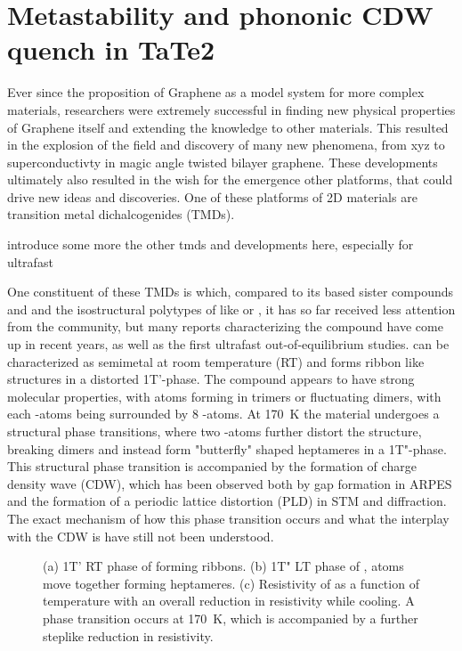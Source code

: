\chapter{Metastability and phononic CDW quench in TaTe2}

Ever since the proposition of Graphene as a model system for more complex materials, researchers were extremely successful in finding new physical properties of Graphene itself and extending the knowledge to other materials.
This resulted in the explosion of the field and discovery of many new phenomena, from xyz to superconductivty in magic angle twisted bilayer graphene.
These developments ultimately also resulted in the wish for the emergence other platforms, that could drive new ideas and discoveries.
One of these platforms of 2D materials are transition metal dichalcogenides (TMDs).

introduce some more the other tmds and developments here, especially for ultrafast

One constituent of these TMDs is  which, compared to its  based sister compounds  and  and the isostructural polytypes of  like  or , it has so far received less attention from the community, but many reports characterizing the compound have come up in recent years, as well as the first ultrafast out-of-equilibrium studies.
 can be characterized as semimetal at room temperature (RT) and forms ribbon like structures in a distorted 1T'-phase.
The compound appears to have strong molecular properties, with  atoms forming in trimers or fluctuating dimers, with each -atoms being surrounded by 8 -atoms.
At \SI{170}{\kelvin} the material undergoes a structural phase transitions, where two -atoms further distort the structure, breaking dimers and instead form "butterfly" shaped heptameres in a 1T"-phase.
This structural phase transition is accompanied by the formation of charge density wave (CDW), which has been observed both by gap formation in ARPES and the formation of a periodic lattice distortion (PLD) in STM and diffraction.
The exact mechanism of how this phase transition occurs and what the interplay with the CDW is have still not been understood.

\begin{figure}
	\centering
	\caption{(a) 1T' RT phase of  forming ribbons. (b) 1T" LT phase of ,  atoms move together forming heptameres. (c) Resistivity of  as a function of temperature with an overall reduction in resistivity while cooling. A phase transition occurs at \SI{170}{\kelvin}, which is accompanied by a further steplike reduction in resistivity.}
	\label{fig:tate_structure}
\end{figure}


